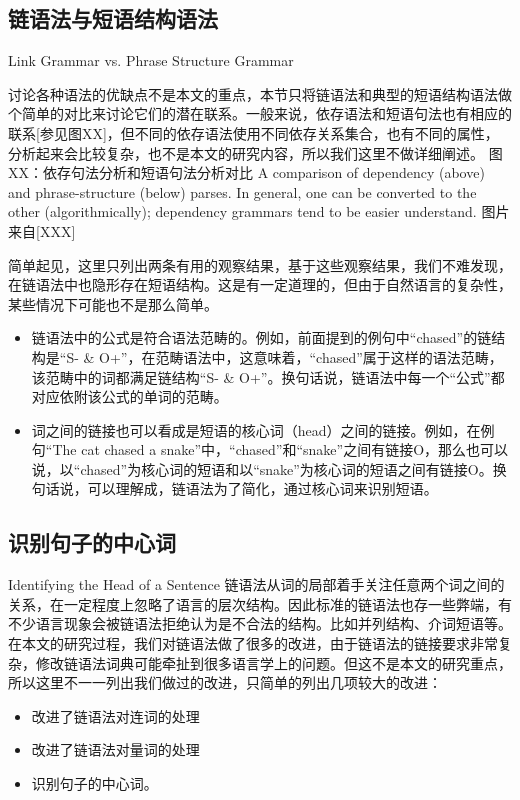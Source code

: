 \subsection{链语法与短语结构语法}{Link Grammar vs. Phrase Structure Grammar}

讨论各种语法的优缺点不是本文的重点，本节只将链语法和典型的短语结构语法做个简单的对比来讨论它们的潜在联系。一般来说，依存语法和短语句法也有相应的联系[参见图XX]，但不同的依存语法使用不同依存关系集合，也有不同的属性，分析起来会比较复杂，也不是本文的研究内容，所以我们这里不做详细阐述。
图XX：依存句法分析和短语句法分析对比
A comparison of dependency (above) and phrase-structure (below) parses.
In general, one can be converted to the other (algorithmically); dependency
grammars tend to be easier understand.
图片来自[XXX]

简单起见，这里只列出两条有用的观察结果，基于这些观察结果，我们不难发现，在链语法中也隐形存在短语结构。这是有一定道理的，但由于自然语言的复杂性，某些情况下可能也不是那么简单。
\begin{itemize}
\item 链语法中的公式是符合语法范畴的。例如，前面提到的例句中“chased”的链结构是“S- \& O+”，在范畴语法中，这意味着，“chased”属于这样的语法范畴，该范畴中的词都满足链结构“S- \& O+”。换句话说，链语法中每一个“公式”都对应依附该公式的单词的范畴。 
\item 词之间的链接也可以看成是短语的核心词（head）之间的链接。例如，在例句“The cat chased a snake”中，“chased”和“snake”之间有链接O，那么也可以说，以“chased”为核心词的短语和以“snake”为核心词的短语之间有链接O。换句话说，可以理解成，链语法为了简化，通过核心词来识别短语。
\end{itemize}

\subsection{识别句子的中心词}{Identifying the Head of a Sentence}
链语法从词的局部着手关注任意两个词之间的关系，在一定程度上忽略了语言的层次结构。因此标准的链语法也存一些弊端，有不少语言现象会被链语法拒绝认为是不合法的结构。比如并列结构、介词短语等。在本文的研究过程，我们对链语法做了很多的改进，由于链语法的链接要求非常复杂，修改链语法词典可能牵扯到很多语言学上的问题。但这不是本文的研究重点，所以这里不一一列出我们做过的改进，只简单的列出几项较大的改进：
\begin{itemize}
\item 改进了链语法对连词的处理
\item 改进了链语法对量词的处理
\item 识别句子的中心词。
\end{itemize}

